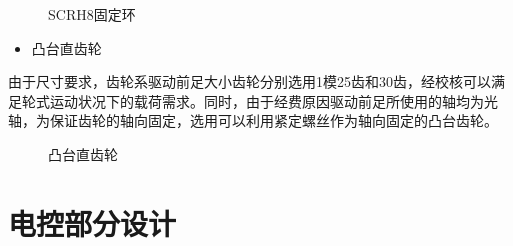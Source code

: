 \documentclass[12pt]{article}
\begin{document}
\begin{CJK}{UTF8}{gbsn}
\begin{figure}[H]
{%
}
\quad
{}
\caption{SCRH8固定环}
\end{figure}
\begin{itemize}
\item 凸台直齿轮
\end{itemize}
由于尺寸要求，齿轮系驱动前足大小齿轮分别选用1模25齿和30齿，经校核可以满足轮式运动状况下的载荷需求。同时，由于经费原因驱动前足所使用的轴均为光轴，为保证齿轮的轴向固定，选用可以利用紧定螺丝作为轴向固定的凸台齿轮。
\begin{figure}[H]
{}
\quad
{}
\caption{凸台直齿轮}
\end{figure}

\section{电控部分设计}

\end{CJK}
\end{document}
